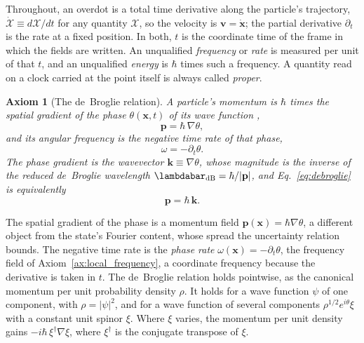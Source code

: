\documentclass[aps,prd,onecolumn,tightenlines,nofootinbib,notitlepage,11pt,floatfix]{revtex4-2}
\theoremstyle{indentedtheorem}
\newtheorem{axiom}{Axiom}
\begin{document}
Throughout, an overdot is a total time derivative along the particle's trajectory, $\dot{\mathcal{X}}\equiv d\mathcal{X}/dt$ for any quantity $\mathcal{X}$, so the velocity is $\mathbf{v}=\dot{\mathbf{x}}$; the partial derivative $\partial_t$ is the rate at a fixed position. In both, $t$ is the coordinate time of the frame in which the fields are written. An unqualified \emph{frequency} or \emph{rate} is measured per unit of that $t$, and an unqualified \emph{energy} is $\hbar$ times such a frequency. A quantity read on a clock carried at the point itself is always called \emph{proper}.

\begin{axiom}[The de~Broglie relation]\label{ax:debroglie}
A particle's momentum is $\hbar$ times the spatial gradient of the phase $\theta(\mathbf{x},t)$ of its wave function \citep{deBroglie1925Thesis},
\begin{equation}
    \mathbf{p} = \hbar \, \nabla\theta ,
    \label{eq:debroglie}
\end{equation}
and its angular frequency is the negative time rate of that phase,
\begin{equation}
    \omega = -\partial_t\theta .
    \label{eq:phase_freq}
\end{equation}
The phase gradient is the \emph{wavevector} $\mathbf{k}\equiv\nabla\theta$, whose magnitude is the inverse of the reduced de~Broglie wavelength $\lambdabar_\mathrm{dB}=\hbar/|\mathbf{p}|$, and Eq.~\eqref{eq:debroglie} is equivalently
\begin{equation}
    \mathbf{p} = \hbar \, \mathbf{k} .
    \label{eq:debroglie_k}
\end{equation}
\end{axiom}

\noindent The spatial gradient of the phase is a momentum field $\mathbf{p}(\mathbf{x})=\hbar\nabla\theta$, a different object from the state's Fourier content, whose spread the uncertainty relation bounds. The negative time rate is the \emph{phase rate} $\omega(\mathbf{x})=-\partial_t\theta$, the frequency field of Axiom~\ref{ax:local_frequency}, a coordinate frequency because the derivative is taken in $t$. The de~Broglie relation holds pointwise, as the canonical momentum per unit probability density $\rho$. It holds for a wave function $\psi$ of one component, with $\rho=|\psi|^2$, and for a wave function of several components $\rho^{1/2}e^{i\theta}\xi$ with a constant unit spinor $\xi$. Where $\xi$ varies, the momentum per unit density gains $-i\hbar\,\xi^\dagger\nabla\xi$, where $\xi^\dagger$ is the conjugate transpose of $\xi$.
\end{document}
